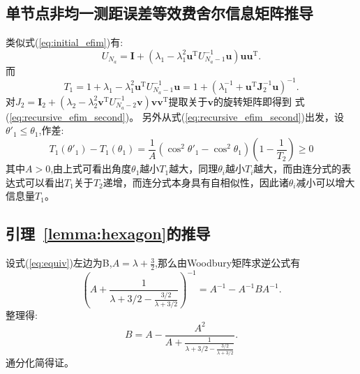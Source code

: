 \subsection{单节点非均一测距误差等效费舍尔信息矩阵推导}\label{B_F_3}
类似式(\ref{eq:initial_efim})有:
\begin{equation}
U_{N_a}=\bm{I}+(\lambda_1-\lambda_1^2 \bm{u}^{\textrm{T}} U_{N_a-1}^{-1}\bm{u})\bm{u}\bm{u}^{\textrm{T}}.
\end{equation}
而
\begin{equation}
T_1=1+\lambda_1-\lambda_1^2 \bm{u}^{\textrm{T}} U_{N_a-1}^{-1}\bm{u}=1+(\lambda_1^{-1}+\bm{u}^{\textrm{T}}\bm{J}_2^{-1}\bm{u})^{-1}.
\end{equation}
对$J_2=\bm{I}_2+(\lambda_2-\lambda_2^2\bm{v}^{\textrm{T}} U_{N_a-2}^{-1}\bm{v})\bm{v}\bm{v}^{\textrm{T}}$提取关于$\bm{v}$的旋转矩阵即得到
式(\ref{eq:recursive_efim_second})。
另外从式(\ref{eq:recursive_efim_second})出发，设$\theta'_1\leq \theta_1$,作差:
\begin{equation}
T_1(\theta'_1)-T_1(\theta_1)=\frac{1}{A}(\cos^2\theta'_1-\cos^2\theta_1)(1-\frac{1}{T_2})\geq 0
\end{equation}
其中$A>0$,由上式可看出角度$\theta_1$越小$T_1$越大，同理$\theta_i$越小$T_i$越大，而由连分式的表达式可以看出$T_1$关于$T_2$递增，而连分式本身具有自相似性，因此诸$\theta_i$减小可以增大信息量$T_1$。

\subsection{引理~\ref{lemma:hexagon}的推导}\label{B_F_4}
  设式(\ref{eq:equiv})左边为B,$A=\lambda+\frac{3}{2}$,那么由Woodbury矩阵求逆公式有
  \begin{equation}
  (A+\frac{1}{\lambda+3/2-\frac{3/2}{\lambda+3/2}})^{-1}=A^{-1}-A^{-1}BA^{-1}.
  \end{equation}
  整理得:
  \begin{equation}
  B=A-\frac{A^2}{A+\frac{1}{\lambda+3/2-\frac{3/2}{\lambda+3/2}}}.
  \end{equation}
  通分化简得证。
